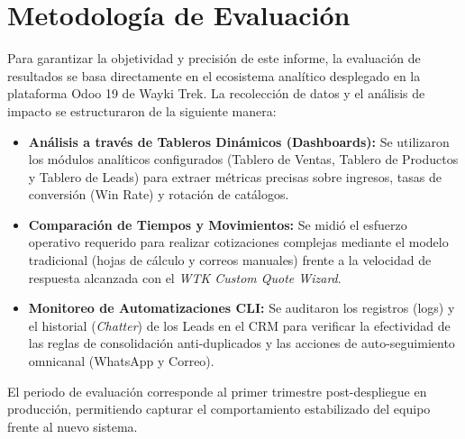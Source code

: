 \section{Metodología de Evaluación}

Para garantizar la objetividad y precisión de este informe, la evaluación de resultados se basa directamente en el ecosistema analítico desplegado en la plataforma Odoo 19 de Wayki Trek. La recolección de datos y el análisis de impacto se estructuraron de la siguiente manera:

\begin{itemize}
    \item \textbf{Análisis a través de Tableros Dinámicos (Dashboards):} Se utilizaron los módulos analíticos configurados (Tablero de Ventas, Tablero de Productos y Tablero de Leads) para extraer métricas precisas sobre ingresos, tasas de conversión (Win Rate) y rotación de catálogos.
    \item \textbf{Comparación de Tiempos y Movimientos:} Se midió el esfuerzo operativo requerido para realizar cotizaciones complejas mediante el modelo tradicional (hojas de cálculo y correos manuales) frente a la velocidad de respuesta alcanzada con el \textit{WTK Custom Quote Wizard}.
    \item \textbf{Monitoreo de Automatizaciones CLI:} Se auditaron los registros (logs) y el historial (\textit{Chatter}) de los Leads en el CRM para verificar la efectividad de las reglas de consolidación anti-duplicados y las acciones de auto-seguimiento omnicanal (WhatsApp y Correo).
\end{itemize}

El periodo de evaluación corresponde al primer trimestre post-despliegue en producción, permitiendo capturar el comportamiento estabilizado del equipo frente al nuevo sistema.
